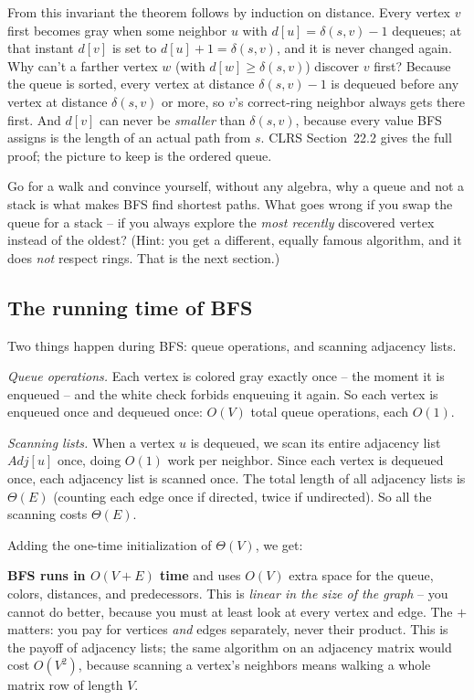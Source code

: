 From this invariant the theorem follows by induction on distance. Every vertex
$v$ first becomes gray when some neighbor $u$ with $d[u] = \delta(s,v) - 1$
dequeues; at that instant $d[v]$ is set to $d[u]+1 = \delta(s,v)$, and it is
never changed again. Why can't a farther vertex $w$ (with $d[w] \ge \delta(s,v)$)
discover $v$ first? Because the queue is sorted, every vertex at distance
$\delta(s,v)-1$ is dequeued before any vertex at distance $\delta(s,v)$ or more,
so $v$'s correct-ring neighbor always gets there first. And $d[v]$ can never be
\emph{smaller} than $\delta(s,v)$, because every value BFS assigns is the length
of an actual path from $s$. CLRS Section~22.2 gives the full proof; the picture
to keep is the ordered queue.

\begin{walkbox}
Go for a walk and convince yourself, without any algebra, why a queue and not a
stack is what makes BFS find shortest paths. What goes wrong if you swap the
queue for a stack -- if you always explore the \emph{most recently} discovered
vertex instead of the oldest? (Hint: you get a different, equally famous
algorithm, and it does \emph{not} respect rings. That is the next section.)
\end{walkbox}

\subsection{The running time of BFS}
\label{ch22:bfs-time}

Two things happen during BFS: queue operations, and scanning adjacency lists.

\emph{Queue operations.} Each vertex is colored gray exactly once -- the moment
it is enqueued -- and the white check forbids enqueuing it again. So each vertex
is enqueued once and dequeued once: $O(V)$ total queue operations, each $O(1)$.

\emph{Scanning lists.} When a vertex $u$ is dequeued, we scan its entire
adjacency list $\mathit{Adj}[u]$ once, doing $O(1)$ work per neighbor. Since each
vertex is dequeued once, each adjacency list is scanned once. The total length of
all adjacency lists is $\Theta(E)$ (counting each edge once if directed, twice if
undirected). So all the scanning costs $\Theta(E)$.

Adding the one-time initialization of $\Theta(V)$, we get:

\begin{complexitybox}
\textbf{BFS runs in $O(V + E)$ time} and uses $O(V)$ extra space for the queue,
colors, distances, and predecessors. This is \emph{linear in the size of the
graph} -- you cannot do better, because you must at least look at every vertex
and edge. The $+$ matters: you pay for vertices \emph{and} edges separately,
never their product. This is the payoff of adjacency lists; the same algorithm on an
adjacency matrix would cost $O(V^2)$, because scanning a vertex's neighbors means
walking a whole matrix row of length $V$.
\end{complexitybox}

